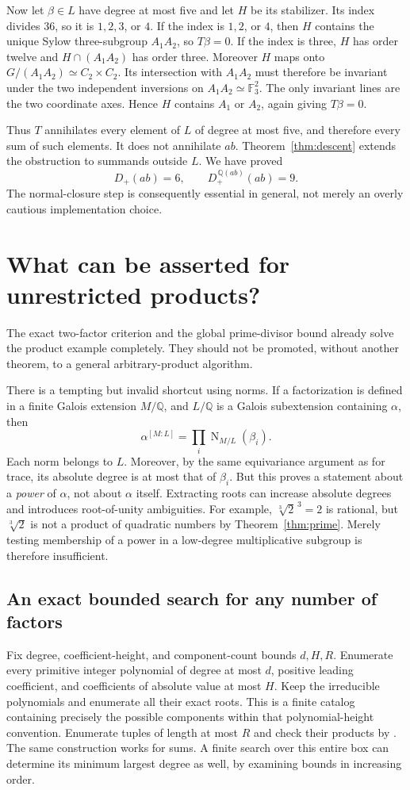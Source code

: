 \documentclass[11pt]{article}
\newcommand{\Q}{\mathbb Q}
\newcommand{\Norm}{\operatorname{N}}
\newcommand{\code}[1]{\texttt{\detokenize{#1}}}
\theoremstyle{definition}\newtheorem{definition}[theorem]{Definition}
\theoremstyle{remark}\newtheorem{remark}[theorem]{Remark}
\begin{document}
Now let $\beta\in L$ have degree at most five and let $H$ be its stabilizer.
Its index divides $36$, so it is $1,2,3$, or $4$. If the index is $1,2$, or
$4$, then $H$ contains the unique Sylow three-subgroup $A_1A_2$, so $T\beta=0$.
If the index is three, $H$ has order twelve and $H\cap(A_1A_2)$ has order
three. Moreover $H$ maps onto
$G/(A_1A_2)\simeq C_2\times C_2$. Its intersection with $A_1A_2$ must
therefore be invariant under the two independent inversions on
$A_1A_2\simeq\mathbb F_3^2$. The only invariant lines are the two coordinate
axes. Hence $H$ contains $A_1$ or $A_2$, again giving $T\beta=0$.

Thus $T$ annihilates every element of $L$ of degree at most five, and therefore
every sum of such elements. It does not annihilate $ab$. Theorem~\ref{thm:descent}
extends the obstruction to summands outside $L$. We have proved
\[
 \boxed{D_+(ab)=6,\qquad D_+^{\,\Q(ab)}(ab)=9.}
\]
The normal-closure step is consequently essential in general, not merely
an overly cautious implementation choice.

\section{What can be asserted for unrestricted products?}
The exact two-factor criterion and the global prime-divisor bound already
solve the product example completely. They should not be promoted, without
another theorem, to a general arbitrary-product algorithm.

There is a tempting but invalid shortcut using norms. If a factorization is
defined in a finite Galois extension $M/\Q$, and $L/\Q$ is a Galois
subextension containing $\alpha$, then
\[
 \alpha^{[M:L]}=\prod_i\Norm_{M/L}(\beta_i).
\]
Each norm belongs to $L$. Moreover, by the same equivariance argument as for
trace, its absolute degree is at most that of $\beta_i$. But this proves a
statement about a \emph{power} of $\alpha$, not about $\alpha$ itself.
Extracting roots can increase absolute degrees and introduces root-of-unity
ambiguities. For example, $\sqrt[3]{2}^{\,3}=2$ is rational, but
$\sqrt[3]{2}$ is not a product of quadratic numbers by
Theorem~\ref{thm:prime}. Merely testing membership of a power in a low-degree
multiplicative subgroup is therefore insufficient.

\subsection{An exact bounded search for any number of factors}
Fix degree, coefficient-height, and component-count bounds $d,H,R$.
Enumerate every primitive integer polynomial of degree at most $d$, positive
leading coefficient, and coefficients of absolute value at most $H$.
Keep the irreducible polynomials and enumerate all their exact roots. This
is a finite catalog containing precisely the possible components within
that polynomial-height convention. Enumerate tuples of length at most $R$
and check their products by \code{RootReduce}. The same construction works
for sums. A finite search over this entire box can determine its minimum
largest degree as well, by examining bounds in increasing order.
\end{document}
